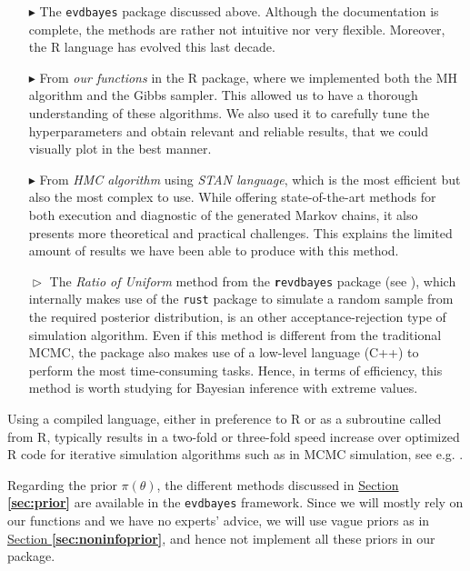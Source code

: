  \begin{itemize}
 	\item[$\blacktriangleright$] The \texttt{evdbayes} package discussed above. Although the documentation is complete, the methods are rather not intuitive nor very flexible. Moreover, the R language has evolved this last decade.
 	
 	\item[$\blacktriangleright$] From \emph{our functions} in the R package, where we implemented both the MH algorithm and the Gibbs sampler. This allowed us to have a thorough understanding of these algorithms. We also used it to carefully tune the hyperparameters and obtain relevant and reliable results, that we could visually plot in the best manner.
 	
 	\item[$\blacktriangleright$] From \emph{HMC algorithm} using \emph{STAN language}, which is the most efficient but also the most complex to use. While offering state-of-the-art methods for both execution and diagnostic of the generated Markov chains, it also presents more theoretical and practical challenges. This explains the limited amount of results we have been able to produce with this method.
 	 	
 	 \item[$\vartriangleright$] The \emph{Ratio of Uniform} method from the \texttt{\textbf{r}evdbayes} package (see \citet{northrop_2017_revd}), which internally makes use of the \texttt{rust} package to simulate a random sample from the required posterior distribution,  is an other acceptance-rejection type of simulation algorithm.
   Even if this method is different from the traditional MCMC, the package also makes use of a low-level language (C++) to perform the most time-consuming tasks. Hence, in terms of efficiency, this method is worth studying for Bayesian inference with extreme values.   
 \end{itemize}
 Using a compiled language, either in preference to R or as a subroutine called from R, typically results in a two-fold or three-fold
 speed increase over optimized R code for iterative simulation algorithms such as in MCMC simulation, see e.g. \citet{stan_development_team_stan_2012}.

Regarding the prior $\pi(\theta)$, the different methods discussed in \hyperref[sec:prior]{Section \textbf{\ref{sec:prior}}} are available in the \texttt{evdbayes} framework. Since we will mostly rely on our functions and we have no experts' advice, we will use vague priors as in \hyperref[sec:noninfoprior]{Section \textbf{\ref{sec:noninfoprior}}}, and hence not implement all these priors in our package. 


